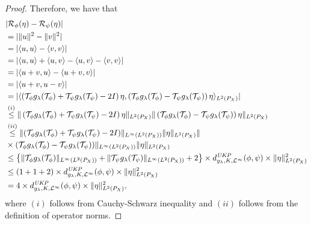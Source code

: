 \documentclass{article} %
\newcommand{\repone}{\phi}
\newcommand{\reptwo}{\psi}
\newcommand{\Tone}{\mathcal{T}_{\repone}}
\newcommand{\Ttwo}{\mathcal{T}_{\reptwo}}
\newcommand{\gl}{g_{\lambda}}
\newcommand{\LPtwo}{L^{2}(P_{X})}
\newcommand{\metricstname}{UKP }
\newcommand{\dopgl}{d_{\gl,K,\mathcal{L}^{\infty}}^{\emph{\metricstname}}}
\newcommand{\dLpgl}{d_{\gl,K,\mathcal{L}^{p}}^{\emph{\metricstname}}}
\newcommand{\trt}[1]{\textcolor{red}{#1}}
\newcommand{\Riskrepone}{\mathcal{R}_{\repone}}
\newcommand{\Riskreptwo}{\mathcal{R}_{\reptwo}}
\theoremstyle{plain}
\begin{document}
\begin{proof}
Therefore, we have that
\[\begin{aligned}
   &|\Riskrepone (\eta)-\Riskreptwo(\eta)|\\
   &= |\|u\|^2- \|v\|^2|\\
   &= |\langle u,u\rangle-\langle v,v \rangle|\\
   &=| \langle u,u\rangle +\langle u,v\rangle-\langle u,v \rangle-\langle v,v \rangle |\\
   &= |\langle u+v,u\rangle-\langle u+v,v \rangle |\\
   &= |\langle u+v,u-v\rangle|\\
   &= |\langle \left(\Tone\gl(\Tone)+ \Ttwo\gl(\Ttwo) -2I\right)\eta , \left(\Tone\gl(\Tone)- \Ttwo\gl(\Ttwo)\right)\eta\rangle_{\LPtwo}|\\
   &\overset{(i)}{\leq} \|\left(\Tone\gl(\Tone)+ \Ttwo\gl(\Ttwo) -2I\right)\eta\|_{\LPtwo}\|\left(\Tone\gl(\Tone)- \Ttwo\gl(\Ttwo)\right)\eta\|_{\LPtwo}\\
   &\overset{(ii)}{\leq} \|(\Tone\gl(\Tone)+ \Ttwo\gl(\Ttwo) - 2I)\|_{L^{\infty}(\LPtwo)}\|\eta\|_{\LPtwo}\|\\
   &\times (\Tone\gl(\Tone) - \Ttwo\gl(\Ttwo))\|_{L^{\infty}(\LPtwo)}\|\eta\|_{\LPtwo}\\
     &\leq \left\{\|\Tone\gl(\Tone) \|_{L^{\infty}(\LPtwo)}+ \|\Ttwo\gl(\Ttwo) \|_{L^{\infty}(\LPtwo)} + 2\right\} \times \dopgl (\repone,\reptwo) \times\|\eta\|_{\LPtwo}^2\\
     &\leq (1+1+2) \times \dopgl (\repone,\reptwo) \times\|\eta\|_{\LPtwo}^2\\
     &= 4\times \dopgl (\repone,\reptwo) \times\|\eta\|_{\LPtwo}^2,
\end{aligned} \]
where $(i)$ follows from Cauchy-Schwarz inequality and $(ii)$ follows from the definition of operator norms. 
\end{proof}


\end{document}
